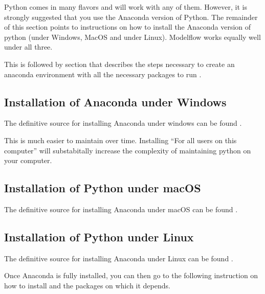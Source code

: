 \documentclass[letterpaper,10pt,english]{jupyterBook}
\begin{document}
\sphinxAtStartPar
Python comes in many flavors and  will work with any of them.  However, it is strongly suggested that you use the Anaconda version of Python.  The remainder of this section points to instructions on how to install the Anaconda version of python (under Windows, MacOS and under Linux). Modelflow works equally well under all three.

\sphinxAtStartPar
This is followed by section that describes the steps necessary to create an anaconda environment with all the necessary packages to run .


\subsection{Installation of Anaconda under Windows}
\label{\detokenize{content/03_Installation/InstallingPython:installation-of-anaconda-under-windows}}
\sphinxAtStartPar
The definitive source for installing Anaconda under windows can be found .

\sphinxAtStartPar
{}  This is much easier to maintain over time.  Installing “For all users on this computer” will substabitally increase the complexity of maintaining python on your computer.


\subsection{Installation of Python under macOS}
\label{\detokenize{content/03_Installation/InstallingPython:installation-of-python-under-macos}}
\sphinxAtStartPar
The definitive source for installing Anaconda under macOS can be found .


\subsection{Installation of Python under Linux}
\label{\detokenize{content/03_Installation/InstallingPython:installation-of-python-under-linux}}
\sphinxAtStartPar
The definitive source for installing Anaconda under Linux can be found .

\sphinxAtStartPar
Once Anaconda is fully installed, you can then go to the following instruction on how to install  and the packages on which it depends.
\end{document}
